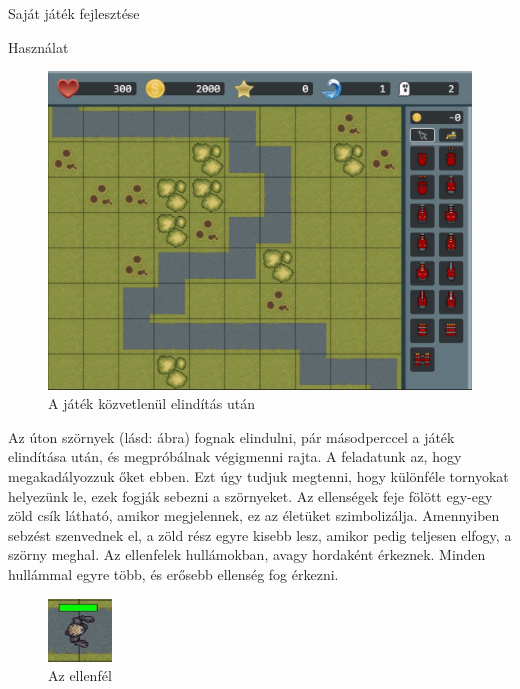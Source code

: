 \begin{MyChapter}{Saját játék fejlesztése}
\begin{MySection}{Használat}
		\begin{figure}[H]
			\centering
			\includegraphics[scale=0.47]{kepek/jatekHasznalat/game_scene}
			\caption{A játék közvetlenül elindítás után}
			\label{fig:jatekHasznalat:game_scene}
		\end{figure}
		
		Az úton szörnyek (lásd:  ábra) fognak elindulni, pár másodperccel a játék elindítása után, és megpróbálnak végigmenni rajta.
		A feladatunk az, hogy megakadályozzuk őket ebben. Ezt úgy tudjuk megtenni, hogy különféle tornyokat helyezünk le, ezek fogják sebezni a szörnyeket.
		Az ellenségek feje fölött egy-egy zöld csík látható, amikor megjelennek, ez az életüket szimbolizálja. Amennyiben sebzést szenvednek el, a zöld rész egyre kisebb lesz, amikor pedig teljesen elfogy, a szörny meghal. Az ellenfelek hullámokban, avagy hordaként érkeznek. Minden hullámmal egyre több, és erősebb ellenség fog érkezni.
		
		\begin{figure}[H]
			\centering
			\includegraphics[width=0.15\textwidth]{kepek/jatekHasznalat/szorny}
			\caption{Az ellenfél}
			\label{fig:jatekHasznalat:szorny}
		\end{figure}
		

\end{MySection}
\end{MyChapter}
